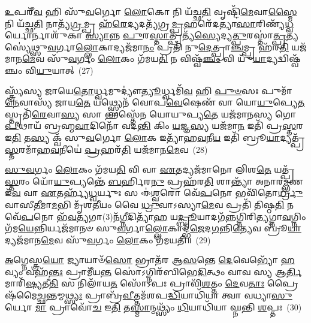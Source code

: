 \-\ul{𑌉}\-𑌪𑌰𑍀᳴\-\ul{𑌵} 𑌹𑌿 𑌸𑍁᳴\-\ul{𑌵}\-𑌰𑍍𑌗𑍋 \ul{𑌲𑍋}\-𑌕𑍋 𑌨𑌿 𑌯᳴𑌚𑍍𑌛\-\ul{𑌤𑌿} 𑌵𑍃𑌷𑍍𑌟𑌿᳴\-\ul{𑌮𑍇}\-𑌵𑌾\-\ul{𑌸𑍍𑌮𑍈} 𑌨𑌿 𑌯᳴𑌚𑍍𑌛\-\ul{𑌤𑌿} 𑌨𑌾𑌤𑍍𑌯᳴\-\ul{𑌗𑍍𑌰}\-𑌮𑍍𑌪𑍍𑌰 𑌹᳴\-\ul{𑌰𑍇}\-𑌦𑍍𑌯𑌦𑌤𑍍𑌯᳴𑌗𑍍𑌰\-\ul{𑌮𑍍𑌪𑍍𑌰}\-𑌹𑌰𑍇᳴𑌦𑌤𑍍𑌯𑌾\-\ul{𑌸𑌾}\-𑌰𑌿𑌣𑍍𑌯᳴\-\ul{𑌧𑍍𑌵}\-𑌰𑍍𑌯𑍋\-𑌰𑍍𑌨𑌾𑌶𑍁᳴𑌕𑌾 \ul{𑌸𑍍𑌯𑌾}\-𑌨𑍍𑌨 \ul{𑌪𑍁}\-𑌰\-\ul{𑌸𑍍𑌤𑌾}\-𑌤𑍍𑌪𑍍𑌰𑌤𑍍𑌯᳴\-\ul{𑌸𑍍𑌯𑍇}\-𑌦𑍍𑌯\-\ul{𑌤𑍍𑌪𑍁}\-𑌰𑌸𑍍𑌤𑌾॑\-\ul{𑌤𑍍𑌪𑍍𑌰}\-𑌤𑍍𑌯𑌸𑍍𑌯𑍇॑𑌥𑍍𑌸𑍁\-\ul{𑌵}\-𑌰𑍍𑌗𑌾\-\ul{𑌲𑍍𑌲𑍋}\-𑌕𑌾𑌦𑍍𑌯𑌜᳴𑌮𑌾\-\ul{𑌨𑌂} 𑌪𑍍𑌰𑌤𑌿᳴ 𑌨𑍁\-\ul{𑌦𑍇}\-𑌤𑍍𑌪𑍍𑌰𑌾\-\ul{𑌞𑍍𑌚}\-𑌮𑍍𑌪𑍍𑌰 𑌹᳴𑌰\-\ul{𑌤𑌿} 𑌯𑌜᳴𑌮𑌾𑌨\-\ul{𑌮𑍇}\-𑌵 𑌸𑍁᳴\-\ul{𑌵}\-𑌰𑍍𑌗𑌂 \ul{𑌲𑍋}\-𑌕𑌂 𑌗᳴𑌮𑌯\-\ul{𑌤𑌿} 𑌨 𑌵𑌿𑌷𑍍𑌵᳴\-\ul{𑌞𑍍𑌚𑌂} 𑌵𑌿 𑌯𑍁᳴\-\ul{𑌯𑌾}\-𑌦𑍍𑌯𑌦𑍍𑌵𑌿𑌷𑍍𑌵᳴𑌞𑍍𑌚𑌂 𑌵𑌿\-\ul{𑌯𑍁}\-𑌯𑌾𑌤𑍍~(27)

𑌸𑍍𑌤𑍍𑌰𑍍𑌯᳴𑌸𑍍𑌯 𑌜𑌾𑌯𑍇\-\ul{𑌤𑍋}\-𑌰𑍍𑌧𑍍𑌵𑌮𑍁𑌦𑍍𑌯𑍗॑\-\ul{𑌤𑍍𑌯𑍂}\-𑌰𑍍𑌧𑍍𑌵𑌮𑌿᳴\-\ul{𑌵} 𑌹𑌿 \ul{𑌪𑍁}\-\-\ul{𑍞}\-𑌸𑌃 𑌪𑍁𑌮𑌾᳴\-\ul{𑌨𑍇}\-𑌵𑌾𑌸𑍍𑌯᳴ 𑌜𑌾𑌯\-\ul{𑌤𑍇} 𑌯𑌥𑍍𑌸𑍍𑌫𑍍𑌯𑍇𑌨᳴ 𑌵𑍋𑌪\-\ul{𑌵𑍇}\-𑌷𑍇𑌣᳴ 𑌵𑌾 𑌯𑍋\-\ul{𑌯𑍁}\-𑌪𑍍𑌯𑍇\-\ul{𑌤} 𑌸𑍍𑌤𑍃𑌤𑌿᳴\-\ul{𑌰𑍇}\-𑌵𑌾\-\ul{𑌸𑍍𑌯} 𑌸𑌾 𑌹𑌸𑍍𑌤𑍇᳴𑌨 𑌯𑍋𑌯𑍁𑌪𑍍𑌯\-\ul{𑌤𑍇} 𑌯𑌜᳴𑌮𑌾𑌨𑌸𑍍𑌯 𑌗𑍋\-\ul{𑌪𑍀}\-𑌥𑌾𑌯᳴ 𑌬𑍍𑌰𑌹𑍍𑌮\-\ul{𑌵𑌾}\-𑌦𑌿𑌨𑍋᳴ 𑌵𑌦\-\ul{𑌨𑍍𑌤𑌿} 𑌕𑌿𑌂 \ul{𑌯}\-𑌜𑍍𑌞\-\ul{𑌸𑍍𑌯} 𑌯𑌜᳴𑌮𑌾\-\ul{𑌨} 𑌇𑌤𑌿᳴ 𑌪𑍍𑌰\-\ul{𑌸𑍍𑌤}\-𑌰 𑌇\-\ul{𑌤𑌿} 𑌤\-\ul{𑌸𑍍𑌯} 𑌕𑍍𑌵᳴ 𑌸𑍁\-\ul{𑌵}\-𑌰𑍍𑌗𑍋 \ul{𑌲𑍋}\-𑌕 𑌇𑌤𑍍𑌯𑌾᳴𑌹\-\ul{𑌵}\-𑌨𑍀\-\ul{𑌯} 𑌇𑌤𑌿᳴ 𑌬𑍍𑌰𑍂\-\ul{𑌯𑌾}\-𑌦𑍍𑌯𑌤𑍍𑌪𑍍𑌰᳴\-\ul{𑌸𑍍𑌤}\-𑌰𑌮𑌾᳴𑌹\-\ul{𑌵}\-𑌨𑍀𑌯𑍇॑ \ul{𑌪𑍍𑌰}\-𑌹𑌰᳴\-\ul{𑌤𑌿} 𑌯𑌜᳴𑌮𑌾𑌨\-\ul{𑌮𑍇}\-𑌵~(28)

\-\ul{𑌸𑍁}\-\-\ul{𑌵}\-𑌰𑍍𑌗𑌂 \ul{𑌲𑍋}\-𑌕𑌂 𑌗᳴𑌮𑌯\-\ul{𑌤𑌿} 𑌵𑌿 𑌵𑌾 \ul{𑌏}\-𑌤𑌦𑍍𑌯𑌜᳴𑌮𑌾𑌨𑍋 𑌲𑌿𑌶\-\ul{𑌤𑍇} 𑌯𑌤𑍍𑌪𑍍𑌰᳴\-\ul{𑌸𑍍𑌤}\-𑌰𑌂 𑌯𑍋᳴\-\ul{𑌯𑍁}\-𑌪𑍍𑌯𑌨𑍍𑌤𑍇᳴ \ul{𑌬}\-𑌰𑍍\mbox{}𑌹𑌿𑌰\-\ul{𑌨𑍁} 𑌪𑍍𑌰𑌹᳴𑌰\-\ul{𑌤𑌿} 𑌶𑌾𑌨𑍍𑌤𑍍𑌯𑌾᳴ 𑌅𑌨𑌾𑌰\-\ul{𑌮𑍍𑌭}\-𑌣 𑌇᳴\-\ul{𑌵} 𑌵𑌾 \ul{𑌏}\-𑌤𑌰𑍍\mbox{}𑌹𑍍𑌯᳴\-\ul{𑌧𑍍𑌵}\-𑌰𑍍𑌯𑍁𑌃 𑌸 𑌈॑\-\ul{𑌶𑍍𑌵}\-𑌰𑍋 𑌵𑍇᳴\-\ul{𑌪}\-𑌨𑍋 𑌭𑌵𑌿᳴𑌤𑍋\-\ul{𑌰𑍍𑌧𑍍𑌰𑍁}\-𑌵𑌾𑌸𑍀\-\ul{𑌤𑍀}\-𑌮𑌾\-\ul{𑌮}\-𑌭𑌿 𑌮𑍃᳴𑌶\-\ul{𑌤𑍀}\-𑌯𑌂 𑌵𑍈 \ul{𑌧𑍍𑌰𑍁}\-𑌵𑌾\-𑌽𑌸𑍍𑌯𑌾\-\ul{𑌮𑍇}\-𑌵 𑌪𑍍𑌰𑌤𑌿᳴ 𑌤𑌿𑌷𑍍𑌠\-\ul{𑌤𑌿} 𑌨 𑌵𑍇᳴\-\ul{𑌪}\-𑌨𑍋 𑌭᳴\-\ul{𑌵}\-𑌤𑍍𑌯𑌗𑌾(3)𑌨᳴\-\ul{𑌗𑍍𑌨𑍀}\-𑌦𑌿𑌤𑍍𑌯𑌾᳴\-\ul{𑌹} 𑌯\-\ul{𑌦𑍍𑌬𑍍𑌰𑍂}\-𑌯𑌾𑌦𑌗᳴\-\ul{𑌨𑍍𑌨}\-𑌗𑍍𑌨𑌿𑌰𑌿\-\ul{𑌤𑍍𑌯}\-𑌗𑍍𑌨𑌾\-\ul{𑌵}\-𑌗𑍍𑌨𑌿𑌂 𑌗᳴𑌮\-\ul{𑌯𑍇}\-𑌨𑍍𑌨𑌿𑌰𑍍𑌯𑌜᳴𑌮𑌾𑌨𑍞 𑌸𑍁\-\ul{𑌵}\-𑌰𑍍𑌗𑌾\-\ul{𑌲𑍍𑌲𑍋}\-𑌕𑌾𑌦𑍍𑌭᳴\-\ul{𑌜𑍇}\-𑌦\-\ul{𑌗}\-𑌨𑍍𑌨𑌿\-\ul{𑌤𑍍𑌯𑍇}\-𑌵 𑌬𑍍𑌰𑍂᳴\-\ul{𑌯𑌾}\-𑌦𑍍𑌯𑌜᳴𑌮𑌾𑌨\-\ul{𑌮𑍇}\-𑌵 𑌸𑍁᳴\-\ul{𑌵}\-𑌰𑍍𑌗𑌂 \ul{𑌲𑍋}\-𑌕𑌂 𑌗᳴𑌮𑌯𑌤𑌿॥~(29)

{\anuvakamend[{\-\ul{𑌆}\-𑌸𑌾\-\ul{𑌦𑍍𑌯} 𑌪𑍍𑌰𑌾𑌨᳴𑌤𑌿𑌦𑍃𑌶𑍍𑌞𑌂 𑌕𑌰𑍋𑌤𑌿 𑌹𑌰𑌤𑌿 𑌵𑌿\-\ul{𑌯𑍁}\-𑌯𑌾𑌦𑍍𑌯𑌜᳴𑌮𑌾𑌨\-\ul{𑌮𑍇}\-𑌵𑌾𑌗𑍍𑌨𑌿𑌰𑌿𑌤𑌿᳴ \ul{𑌸}\-𑌪𑍍𑌤𑌦᳴𑌶 𑌚}]}%

\-\ul{𑌅}\-𑌗𑍍𑌨𑍇𑌸𑍍𑌤𑍍𑌰\-\ul{𑌯𑍋} 𑌜𑍍𑌯𑌾𑌯𑌾𑍞᳴\-\ul{𑌸𑍋} 𑌭𑍍𑌰𑌾𑌤᳴𑌰 𑌆\-\ul{𑌸}\-𑌨𑍍𑌤𑍇 \ul{𑌦𑍇}\-𑌵𑍇𑌭𑍍𑌯𑍋᳴ \ul{𑌹}\-𑌵𑍍𑌯𑌂 𑌵𑌹᳴\-\ul{𑌨𑍍𑌤𑌃} 𑌪𑍍𑌰𑌾𑌮𑍀᳴𑌯\-\ul{𑌨𑍍𑌤} 𑌸𑍋॑\-𑌽𑌗𑍍𑌨𑌿𑌰᳴𑌬𑌿𑌭𑍇\-\ul{𑌦𑌿}\-𑌤𑍍𑌥𑌂 𑌵𑌾𑌵 𑌸𑍍𑌯 𑌆\-\ul{𑌰𑍍𑌤𑌿}\-𑌮𑌾𑌰𑌿᳴\-\ul{𑌷𑍍𑌯}\-𑌤𑍀\-\ul{𑌤𑌿} 𑌸 𑌨𑌿𑌲𑌾᳴𑌯\-\ul{𑌤} 𑌸𑍋᳴\-𑌽𑌪𑌃 𑌪𑍍𑌰𑌾𑌵𑌿᳴\-\ul{𑌶}\-𑌤𑍍𑌤𑌂 \ul{𑌦𑍇}\-𑌵\-\ul{𑌤𑌾𑌃} 𑌪𑍍𑌰𑍈𑌷᳴𑌮𑍈\-\ul{𑌚𑍍𑌛}\-𑌨𑍍𑌤𑌮𑍍𑌮\-\ul{𑌥𑍍𑌸𑍍𑌯𑌃} 𑌪𑍍𑌰𑌾𑌬𑍍𑌰᳴\-\ul{𑌵𑍀}\-𑌤𑍍𑌤𑌮᳴𑌶𑌪\-\ul{𑌦𑍍𑌧𑌿}\-𑌯𑌾𑌧𑌿᳴𑌯𑌾 𑌤𑍍𑌵𑌾 𑌵𑌧𑍍𑌯𑌾\-\ul{𑌸𑍁}\-𑌰𑍍𑌯𑍋 \ul{𑌮𑌾} 𑌪𑍍𑌰𑌾𑌵𑍋᳴\-\ul{𑌚} 𑌇\-\ul{𑌤𑌿} 𑌤\-\ul{𑌸𑍍𑌮𑌾}\-𑌨𑍍𑌮𑌥𑍍𑌸𑍍𑌯𑌂᳴ \ul{𑌧𑌿}\-𑌯𑌾𑌧𑌿᳴𑌯𑌾 𑌘𑍍𑌨𑌨𑍍𑌤𑌿 \ul{𑌶}\-𑌪𑍍𑌤𑌃~(30)

